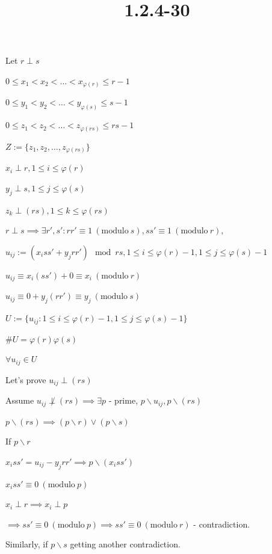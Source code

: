 \documentclass{article}
\title{1.2.4-30}
\begin{document}
\maketitle

Let \( r \perp s \)

\( 0 \leq x_1 < x_2 < \ldots < x_{\varphi(r)} \leq r - 1 \)

\( 0 \leq y_1 < y_2 < \ldots < y_{\varphi(s)} \leq s - 1 \)

\( 0 \leq z_1 < z_2 < \ldots < z_{\varphi(rs)} \leq rs - 1 \)

\( Z := \{ z_1, z_2, \ldots, z_{\varphi(rs)} \} \)

\( x_i \perp r, 1 \leq i \leq \varphi(r) \)

\( y_j \perp s, 1 \leq j \leq \varphi(s) \)

\( z_k \perp (rs), 1 \leq k \leq \varphi(rs) \)

\( r \perp s \implies \exists r',s': rr' \equiv 1 \ (\mathrm{modulo}\ s), ss' \equiv 1 \ (\mathrm{modulo}\ r), \)

\( u_{ij} := (x_iss' + y_jrr') \mod rs, 1 \leq i \leq \varphi(r) - 1, 1 \leq j \leq \varphi(s) - 1 \)

\( u_{ij} \equiv x_i(ss') + 0 \equiv x_i\ (\mathrm{modulo}\ r) \)

\( u_{ij} \equiv 0 + y_j(rr') \equiv y_j\ (\mathrm{modulo}\ s) \)

\( U := \{ u_{ij}: 1 \leq i \leq \varphi(r) - 1, 1 \leq j \leq \varphi(s) - 1 \} \)

\( \#U = \varphi(r)\varphi(s) \)

\( \forall u_{ij} \in U \)

Let's prove \( u_{ij} \perp (rs) \)

Assume \( u_{ij} \not\perp (rs) \implies \exists p \) - prime, \( p \backslash u_{ij}, p \backslash (rs) \)

\( p \backslash (rs) \implies (p \backslash r) \lor (p \backslash s) \)

If \( p \backslash r \)

\( x_i ss' = u_{ij} - y_j rr' \implies p \backslash (x_i ss') \)

\( x_i ss' \equiv 0\ (\mathrm{modulo}\ p) \)

\( x_i \perp r \implies x_i \perp p \)

\( \implies ss' \equiv 0\ (\mathrm{modulo}\ p) \implies ss' \equiv 0\ (\mathrm{modulo}\ r) \) - contradiction.

Similarly, if \( p \backslash s \) getting another contradiction.
\end{document}
